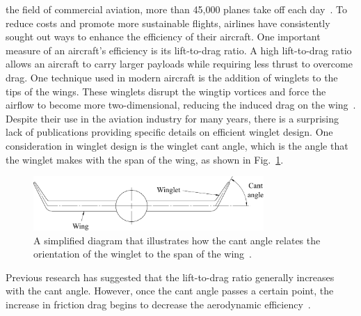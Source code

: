 \documentclass[journal,letterpaper]{IEEEtran}
\begin{document}
 the field of commercial aviation, more than 45,000 planes take off each day~\cite{FAA}.
To reduce costs and promote more sustainable flights, airlines have consistently sought out ways to enhance the efficiency of their aircraft.
One important measure of an aircraft's efficiency is its lift-to-drag ratio.
A high lift-to-drag ratio allows an aircraft to carry larger payloads while requiring less thrust to overcome drag.
One technique used in modern aircraft is the addition of winglets to the tips of the wings.
These winglets disrupt the wingtip vortices and force the airflow to become more two-dimensional, reducing the induced drag on the wing~\cite{NASA}.
Despite their use in the aviation industry for many years, there is a surprising lack of publications providing specific details on efficient winglet design.
One consideration in winglet design is the winglet cant angle, which is the angle that the winglet makes with the span of the wing, as shown in Fig.~\ref{fig:cant}.

\begin{figure}[H]
    \centering
    \includegraphics[width=3.45in]{cantDiag}
    \caption{A simplified diagram that illustrates how the cant angle relates the orientation of the winglet to the span of the wing~\cite{cantDiag}.}
    \label{fig:cant}
\end{figure}
\noindent
Previous research has suggested that the lift-to-drag ratio generally increases with the cant angle.
However, once the cant angle passes a certain point, the increase in friction drag begins to decrease the aerodynamic efficiency~\cite{variableCant}.
\end{document}
